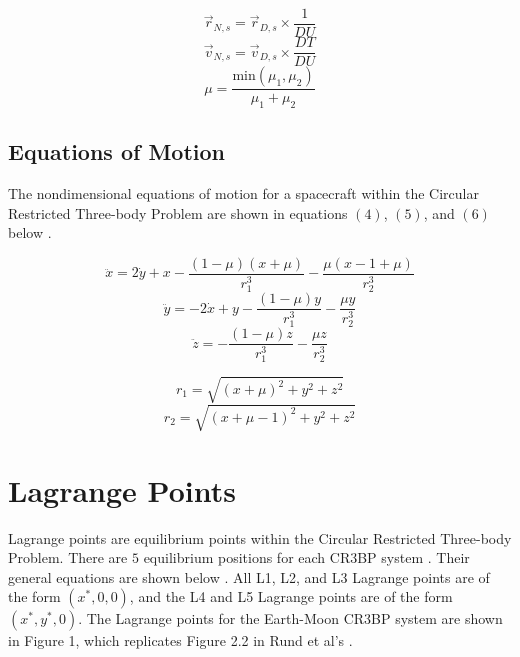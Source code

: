 \documentclass[conf]{new-aiaa}
\begin{document}
\begin{multicols}{2}
\begin{equation}
    \overrightarrow{r}_{N,s} = \overrightarrow{r}_{D,s} \times \frac{1}{DU}
\end{equation}
\begin{equation}
    \overrightarrow{v}_{N,s} = \overrightarrow{v}_{D,s} \times \frac{DT}{DU}
\end{equation}
\begin{equation}
    \mu = \frac{\text{min}(\mu_1, \mu_2)}{\mu_1 + \mu_2}
\end{equation}

\subsection{Equations of Motion}
The nondimensional equations of motion for a spacecraft within the Circular Restricted 
Three-body Problem are shown in equations $(4)$, $(5)$, and $(6)$ below
\cite{vallado2001fundamentals}.

\begin{equation}
\ddot{x} = 2\dot{y} + x - \frac{(1-\mu)(x + \mu)}{r_1^3} - 
    \frac{\mu (x - 1 + \mu)}{r_2^3}
\end{equation}
\begin{equation}
\ddot{y} = -2\dot{x} + y - \frac{(1 - \mu)y}{r_1^3} - \frac{\mu y}{r_2^3}
\end{equation}
\begin{equation}
\ddot{z} = -\frac{(1-\mu)z}{r_1^3} - \frac{\mu z}{r_2^3}
\end{equation}

\begin{equation*}
    r_1 = \sqrt{(x+\mu)^2 + y^2 + z^2}
\end{equation*}
\begin{equation*}
    r_2 = \sqrt{(x+\mu-1)^2 + y^2 + z^2}
\end{equation*}

\section{Lagrange Points}
Lagrange points are equilibrium points within the Circular Restricted Three-body
Problem. There are $5$ equilibrium positions for each CR3BP system
\cite{vallado2001fundamentals}. Their general equations are shown below
\cite{rund2018interplanetary}. All L1, L2, and L3 Lagrange points are of the form 
$\left( x^*, 0, 0 \right)$, and the L4 and L5 Lagrange points are of the form 
$\left( x^*, y^*, 0 \right)$. The Lagrange points for the Earth-Moon CR3BP system
are shown in Figure 1, which replicates Figure 2.2 in Rund et al's \cite{rund2018interplanetary}.


\end{multicols}
\end{document}
